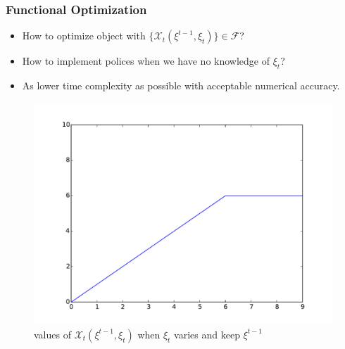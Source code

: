 \documentclass{beamer}
\begin{document}
\begin{frame}{}
\frametitle{Functional Optimization}
\begin{itemize}
\item How to optimize object with $\{\mathcal{X}_t(\xi^{t-1},\xi_t)\} \in \mathcal{F}$?
\item How to implement polices when we have no knowledge of $\xi_{t}$?
\item As lower time complexity as possible with acceptable numerical accuracy.
\end{itemize}

\begin{figure}
\centering
\includegraphics[width=.6\textwidth]{plf_1.pdf}
\caption{values of $\mathcal{X}_t(\xi^{t-1},\xi_t)$ when $\xi_t$ varies and keep $\xi^{t-1}$}\label{plf:1}
\end{figure}

\end{frame}
\end{document}
